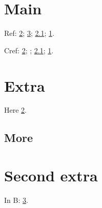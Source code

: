 \documentclass{article}
\begin{document}
\section{Main}\label{main}
Ref: \ref{app:a}; \ref{app:b}; \ref{sub:a}; \ref{main}.

Cref: \cref{app:a}; ; \cref{sub:a}; \cref{main}.
\appendix
\section{Extra}\label{app:a}
Here \cref{app:a}.
\subsection{More}\label{sub:a}
\section{Second extra}\label{app:b}
In B: \ref{app:b}.
\end{document}
